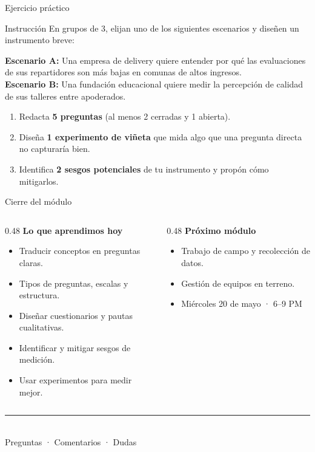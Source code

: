 \documentclass[aspectratio=169, 12pt]{beamer}
\begin{document}
\begin{frame}{Ejercicio práctico}
  \begin{block}{Instrucción}
    En grupos de 3, elijan uno de los siguientes escenarios y diseñen un instrumento breve:
  \end{block}
  \vspace{0.3cm}
  \textbf{Escenario A:} Una empresa de delivery quiere entender por qué las evaluaciones de sus repartidores son más bajas en comunas de altos ingresos.\\[0.3cm]
  \textbf{Escenario B:} Una fundación educacional quiere medir la percepción de calidad de sus talleres entre apoderados.\\[0.3cm]
  \begin{enumerate}
    \item Redacta \textbf{5 preguntas} (al menos 2 cerradas y 1 abierta).
    \item Diseña \textbf{1 experimento de viñeta} que mida algo que una pregunta directa no capturaría bien.
    \item Identifica \textbf{2 sesgos potenciales} de tu instrumento y propón cómo mitigarlos.
  \end{enumerate}
\end{frame}

\begin{frame}{Cierre del módulo}
  \begin{columns}[T]
    \begin{column}{0.48\textwidth}
      \textbf{\color{daMagenta}Lo que aprendimos hoy}
      \begin{itemize}
        \small
        \item Traducir conceptos en preguntas claras.
        \item Tipos de preguntas, escalas y estructura.
        \item Diseñar cuestionarios y pautas cualitativas.
        \item Identificar y mitigar sesgos de medición.
        \item Usar experimentos para medir mejor.
      \end{itemize}
    \end{column}
    \begin{column}{0.48\textwidth}
      \textbf{\color{daPurpleLight}Próximo módulo}
      \begin{itemize}
        \small
        \item Trabajo de campo y recolección de datos.
        \item Gestión de equipos en terreno.
        \item Miércoles 20 de mayo · 6--9 PM
      \end{itemize}
    \end{column}
  \end{columns}
  \vspace{0.5cm}
  \begin{center}
    {\color{daMagenta}\rule{6cm}{0.8pt}}\\[0.3cm]
    {\small\color{daLightBg!70!black} Preguntas · Comentarios · Dudas}
  \end{center}
\end{frame}
\end{document}
